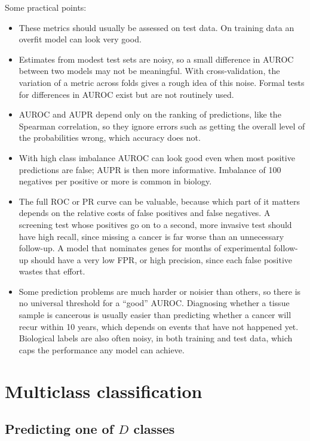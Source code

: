 Some practical points:
\begin{itemize}
  \item These metrics should usually be assessed on test data. On training data an overfit model can look very good.
  \item Estimates from modest test sets are noisy, so a small difference in AUROC between two models may not be meaningful. With cross-validation, the variation of a metric across folds gives a rough idea of this noise. Formal tests for differences in AUROC exist but are not routinely used.
  \item AUROC and AUPR depend only on the ranking of predictions, like the Spearman correlation, so they ignore errors such as getting the overall level of the probabilities wrong, which accuracy does not.
  \item With high class imbalance AUROC can look good even when most positive predictions are false; AUPR is then more informative. Imbalance of 100 negatives per positive or more is common in biology.
  \item The full ROC or PR curve can be valuable, because which part of it matters depends on the relative costs of false positives and false negatives. A screening test whose positives go on to a second, more invasive test should have high recall, since missing a cancer is far worse than an unnecessary follow-up. A model that nominates genes for months of experimental follow-up should have a very low FPR, or high precision, since each false positive wastes that effort.
  \item Some prediction problems are much harder or noisier than others, so there is no universal threshold for a ``good'' AUROC. Diagnosing whether a tissue sample is cancerous is usually easier than predicting whether a cancer will recur within 10 years, which depends on events that have not happened yet. Biological labels are also often noisy, in both training and test data, which caps the performance any model can achieve.
\end{itemize}

\section{Multiclass classification}

\subsection{\texorpdfstring{Predicting one of $D$ classes}{Predicting one of D classes}}

